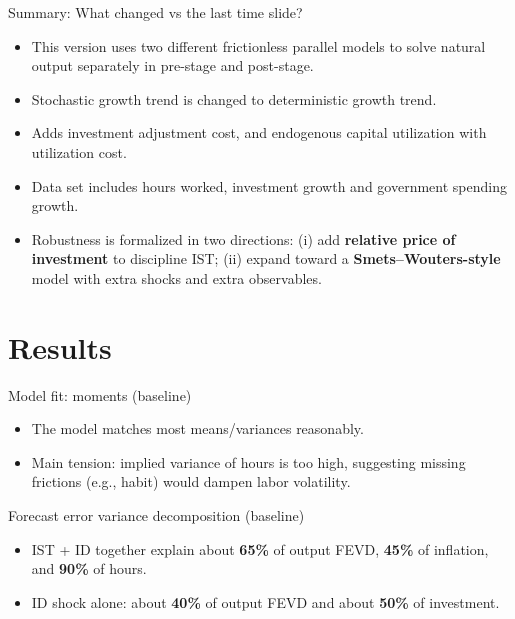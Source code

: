 \documentclass[10pt]{beamer}
\begin{document}
\begin{frame}{Summary: What changed vs the last time slide?}
	\begin{itemize}
        \item This version uses two different frictionless parallel models to solve natural output separately in pre-stage and post-stage.
        \item Stochastic growth trend is changed to deterministic growth trend.
		\item Adds investment adjustment cost, and endogenous capital utilization with utilization cost.
		\item Data set includes hours worked, investment growth and government spending growth.
		\item Robustness is formalized in two directions:
			(i) add \textbf{relative price of investment} to discipline IST;
			(ii) expand toward a \textbf{Smets--Wouters-style} model with extra shocks and extra observables.
	\end{itemize}
\end{frame}

\section{Results}

\begin{frame}{Model fit: moments (baseline)}
	\begin{itemize}
		\item The model matches most means/variances reasonably.
		\item Main tension: implied variance of hours is too high, suggesting missing frictions (e.g., habit) would dampen labor volatility.
	\end{itemize}

	\vspace{0.4em}
	\centering
	{\scriptsize}
\end{frame}

\begin{frame}{Forecast error variance decomposition (baseline)}
	\begin{itemize}
		\item IST + ID together explain about \textbf{65\%} of output FEVD, \textbf{45\%} of inflation, and \textbf{90\%} of hours.
		\item ID shock alone: about \textbf{40\%} of output FEVD and about \textbf{50\%} of investment.
	\end{itemize}

	\vspace{0.3em}
	\centering
	{\scriptsize}
\end{frame}
\end{document}
